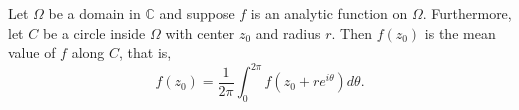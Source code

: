 \documentclass[12pt]{article}
\begin{document}
Let $\Omega$ be a domain in $\mathbb{C}$ 
and suppose $f$ is an analytic function on $\Omega$. 
Furthermore, let $C$ be a circle inside $\Omega$ 
with center $z_0$ and radius $r$. Then $f(z_0)$ 
is the mean value of $f$ along $C$, that is, 
\begin{displaymath}
f(z_0)=\frac{1}{2\pi}\int_0^{2\pi}f(z_0+re^{i\theta})d\theta.
\end{displaymath}
\end{document}

